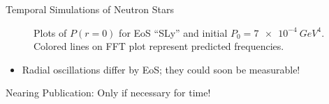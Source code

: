\documentclass[handout]{beamer}
\begin{document}
\begin{frame}{Temporal Simulations of Neutron Stars}
\begin{figure}[h!]
\begin{subfigure}{.5\textwidth}
            \end{subfigure}
            \vspace{-10pt}
            \caption[]{Plots of $P(r=0)$ for EoS ``SLy'' and initial $P_0 = \SI{7e-4}{GeV^4}$. Colored lines on FFT plot represent predicted frequencies.}
        \end{figure}
        \vspace{-15pt}
        \begin{itemize}
        \item Radial oscillations differ by EoS; they could soon be measurable!
        \end{itemize}

    \end{frame}


    \begin{frame}{Nearing Publication: }
        Only if necessary for time!
    \end{frame}
\end{document}
